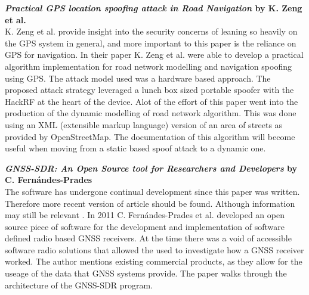 \textbf{\emph{Practical GPS location spoofing attack in Road Navigation} by K. Zeng et al.} \\
K. Zeng et al. provide insight into the security concerns of leaning so heavily on the GPS system in general, and more important to this
paper is the reliance on GPS for navigation. In their paper \cite{RN9} K. Zeng et al. were able to develop a practical algorithm
implementation for road network modelling and navigation spoofing using GPS. The attack model used was a hardware based approach. 
The proposed attack strategy leveraged a lunch box sized portable spoofer with the HackRF at the heart of the device. Alot of the effort
of this paper went into the production of the dynamic modelling of road network algorithm. This was done using an XML (extensible markup language)
version of an area of streets as provided by OpenStreetMap. The documentation of this algorithm will become 
useful when moving from a static based spoof attack to a dynamic one.

\medskip

\textbf{\emph{GNSS-SDR: An Open Source tool for Researchers and Developers} by C. Fern\'andes-Prades} \\
The software has undergone continual development since this paper was written. Therefore more recent version of article should be found.
Although information may still be relevant \cite{RN16}.
In 2011 C. Fern\'andes-Prades et al. developed an open source piece of software for the development and implementation of software defined radio based
GNSS receivers. At the time there was a void of accessible software radio solutions that allowed the used to investigate how a GNSS receiver worked.
The author mentions existing commercial products, as they allow for the useage of the data that GNSS systems provide.
The paper walks through the architecture of the GNSS-SDR program.

\medskip

